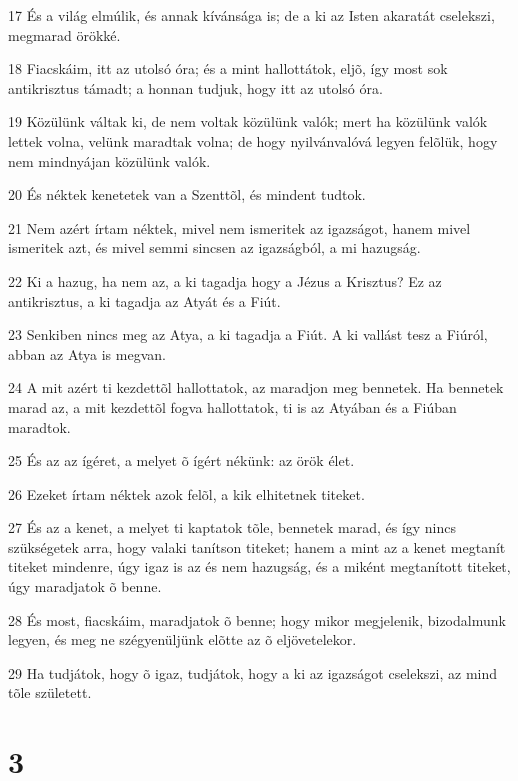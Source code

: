 \par 17 És a világ elmúlik, és annak kívánsága is; de a ki az Isten akaratát  cselekszi, megmarad örökké.
\par 18 Fiacskáim, itt az utolsó óra; és a mint hallottátok, eljõ, így most sok antikrisztus támadt; a honnan tudjuk, hogy itt az utolsó óra.
\par 19 Közülünk váltak ki, de nem voltak közülünk valók; mert ha közülünk valók lettek volna, velünk maradtak volna; de hogy nyilvánvalóvá legyen felõlük, hogy nem mindnyájan közülünk valók.
\par 20 És néktek kenetetek van a Szenttõl, és  mindent tudtok.
\par 21 Nem azért írtam néktek, mivel nem ismeritek az igazságot, hanem mivel ismeritek azt, és mivel semmi sincsen az igazságból, a mi hazugság.
\par 22 Ki a hazug, ha nem az, a ki tagadja hogy a Jézus a Krisztus? Ez az antikrisztus, a ki tagadja az Atyát és a Fiút.
\par 23 Senkiben nincs meg az Atya, a ki tagadja a Fiút. A ki vallást tesz a Fiúról, abban az Atya is megvan.
\par 24 A mit azért ti kezdettõl hallottatok, az maradjon meg bennetek. Ha bennetek marad az, a mit kezdettõl fogva hallottatok, ti is az Atyában és a Fiúban maradtok.
\par 25 És az az ígéret, a melyet õ ígért nékünk: az örök élet.
\par 26 Ezeket írtam néktek azok felõl, a kik elhitetnek titeket.
\par 27 És az a kenet, a melyet ti kaptatok tõle, bennetek marad, és így nincs szükségetek arra, hogy  valaki tanítson titeket; hanem a mint az a kenet megtanít titeket mindenre, úgy igaz is az és nem hazugság, és a miként megtanított titeket, úgy maradjatok õ benne.
\par 28 És most, fiacskáim, maradjatok õ benne; hogy mikor megjelenik, bizodalmunk legyen, és meg ne szégyenüljünk elõtte az õ eljövetelekor.
\par 29 Ha tudjátok, hogy õ igaz, tudjátok, hogy a ki az igazságot cselekszi, az mind tõle született.

\chapter{3}

